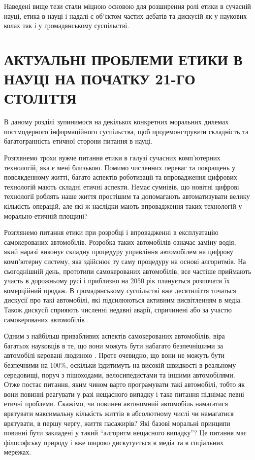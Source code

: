 Наведені вище тези стали міцною основою для розширення ролі етики в сучасній науці, етика в науці і надалі є об'єктом частих дебатів та дискусій як у наукових колах так і у громадянському суспільстві. 

\clearpage

\section[РОЗДІЛ 2. АКТУАЛЬНІ ПРОБЛЕМИ ЕТИКИ В НАУЦІ НА ПОЧАТКУ 21-ГО СТОЛІТТЯ]{АКТУАЛЬНІ ПРОБЛЕМИ ЕТИКИ В НАУЦІ НА ПОЧАТКУ 21-ГО СТОЛІТТЯ}

В даному розділі зупинимося на декількох конкретних моральних дилемах постмодерного інформаційного суспільства, щоб продемонструвати складність та багатогранність етичної сторони питання в науці. 

Розглянемо трохи вужче питання етики в галузі сучасних комп'ютерних технологій, яка є мені близькою. Помимо численних переваг та покращень у повсякденному житті, багато аспектів роботизації та впровадження цифрових технологій мають складні етичні аспекти. Немає сумнівів, що новітні цифрові технології роблять наше життя простішим та допомагають автоматизувати велику кількість операцій, але які ж наслідки мають впровадження таких технологій у морально-етичній площині?

Розглянемо питання етики при розробці і впровадженні в експлуатацію самокерованих автомобілів. Розробка таких автомобілів означає заміну водія, який наразі виконує складну процедуру управління автомобілем на цифрову комп'ютерну систему, яка здійснює ту саму процедуру на основі алгоритмів. На сьогоднішній день, прототипи самокерованих автомобілів, все частіше приймають участь в дорожньому русі і приблизно на 2050 рік планується розпочати їх комерційний продаж. В громадянському суспільстві вже десятиліття точаться дискусії про такі автомобілі, які підсилюються активним висвітленням в медіа. Також дискусії сприяють численні недавні аварії, спричинені або за участю самокерованих автомобілів \cite{holstein2018ethical}. 

Одним з найбільш привабливих аспектів самокерованих автомобілів, віра багатьох науковців в те, що вони можуть бути набагато безпечнішими за автомобілі керовані людиною \cite{nees2019safer}. Проте очевидно, що вони не можуть бути безпечними на 100\%, оскільки їздитимуть на високій швидкості в реальному середовищі, поруч з пішоходами, велосипедистами та іншими автомобілями. Отже постає питання, яким чином варто програмувати такі автомобілі, тобто як вони повинні реагувати у разі нещасного випадку і таке питання піднімає певні етичні проблеми. Скажімо, чи повинен автономний автомобіль намагатися врятувати максимальну кількість життів в абсолютному числі чи намагатися врятувати, в першу чергу, життя пасажирів? Які базові моральні принципи повинні бути закладені у такий \foreignquote{ukrainian}{алгоритм нещасного випадку}? Це питання має філософську природу і вже широко дискутується в медіа та в соціальних мережах. 

